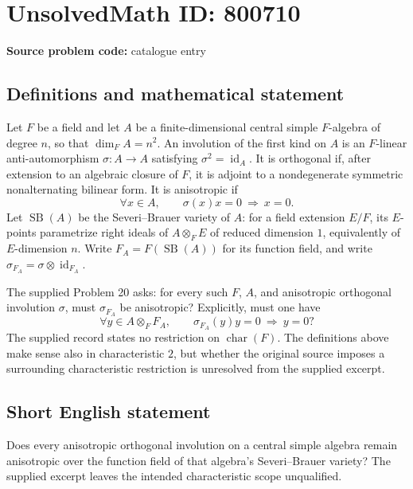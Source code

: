 \documentclass[11pt]{article}
\begin{document}
\section*{UnsolvedMath ID: 800710}
\textbf{Source problem code:} catalogue entry
\subsection{Definitions and mathematical statement}
Let \(F\) be a field and let \(A\) be a finite-dimensional central simple \(F\)-algebra of degree \(n\), so that \(\dim_F A=n^2\). An involution of the first kind on \(A\) is an \(F\)-linear anti-automorphism \(\sigma\colon A\to A\) satisfying \(\sigma^2=\operatorname{id}_A\). It is orthogonal if, after extension to an algebraic closure of \(F\), it is adjoint to a nondegenerate symmetric nonalternating bilinear form. It is anisotropic if
\[
\forall x\in A,\qquad \sigma(x)x=0\ \Longrightarrow\ x=0.
\]
Let \(\operatorname{SB}(A)\) be the Severi--Brauer variety of \(A\): for a field extension \(E/F\), its \(E\)-points parametrize right ideals of \(A\otimes_F E\) of reduced dimension \(1\), equivalently of \(E\)-dimension \(n\). Write \(F_A=F(\operatorname{SB}(A))\) for its function field, and write \(\sigma_{F_A}=\sigma\otimes\operatorname{id}_{F_A}\).

The supplied Problem 20 asks: for every such \(F\), \(A\), and anisotropic orthogonal involution \(\sigma\), must \(\sigma_{F_A}\) be anisotropic? Explicitly, must one have
\[
\forall y\in A\otimes_F F_A,\qquad
\sigma_{F_A}(y)y=0\ \Longrightarrow\ y=0?
\]
The supplied record states no restriction on \(\operatorname{char}(F)\). The definitions above make sense also in characteristic \(2\), but whether the original source imposes a surrounding characteristic restriction is unresolved from the supplied excerpt.
\subsection{Short English statement}
Does every anisotropic orthogonal involution on a central simple algebra remain anisotropic over the function field of that algebra's Severi--Brauer variety? The supplied excerpt leaves the intended characteristic scope unqualified.
\end{document}
